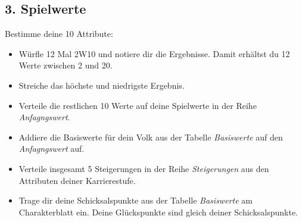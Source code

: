 \documentclass[a4paper,10pt,twoside,twocolumn,openany,nodeprecatedcode,bg=print]{dndbook}
\begin{document}

\subsection{3. Spielwerte}
Bestimme deine 10 Attribute:
\begin{itemize}[noitemsep]
  \item Würfle 12 Mal 2W10 und notiere dir die Ergebnisse. Damit erhältst du 12 Werte zwischen 2 und 20.
  \item Streiche das höchste und niedrigste Ergebnis.
  \item Verteile die restlichen 10 Werte auf deine Spielwerte in der Reihe \textit{Anfagngswert}.
  \item Addiere die Basiswerte für dein Volk aus der Tabelle \textit{Basiswerte} auf den \textit{Anfagngswert} auf.
  \item Verteile insgesamt 5 Steigerungen in der Reihe \textit{Steigerungen} aus den Attributen deiner Karrierestufe.
  \item Trage dir deine Schicksalspunkte aus der Tabelle \textit{Basiswerte} am Charakterblatt ein. Deine Glückspunkte sind gleich deiner Schicksalspunkte.
\end{itemize}
\end{document}
